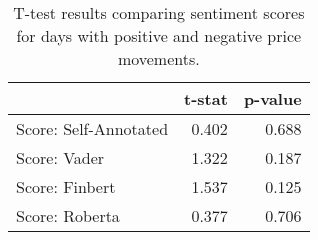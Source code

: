 \begin{table}
\caption{T-test results comparing sentiment scores for days with positive and negative price movements.}
\label{tbl:sentiment_scores_ttest}
\begin{tabular}{lrr}
\toprule
 & t-stat & p-value \\
\midrule
Score: Self-Annotated & 0.402 & 0.688 \\
Score: Vader & 1.322 & 0.187 \\
Score: Finbert & 1.537 & 0.125 \\
Score: Roberta & 0.377 & 0.706 \\
\bottomrule
\end{tabular}
\end{table}
